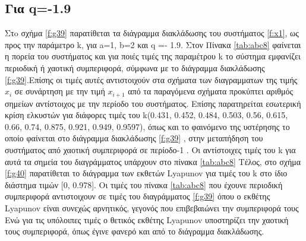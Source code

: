\subsection{Για q=-1.9}
Στo σχήμα \ref{f:g39} παρατίθεται τα διάγραμμα διακλάδωσης του συστήματος \ref{f:x1}, ως προς την παράμετρο k, για a=1, b=2 και q =- 1.9. 
Στον Πίνακα \ref{tab:abc8} φαίνεται η πορεία του συστήματος και για ποιές τιμές της παραμέτρου  k το σύστημα εμφανίζει περιοδική ή χαοτική συμπεριφορά, σύμφωνα με το διάγραμμα διακλάδωσης \ref{f:g39}.Επίσης οι τιμές αυτές αντιστοιχούν στα σχήματα των διαγραμματων της τιμής \(x_i\) σε συνάρτηση με την τιμή \(x_{i+1}\) από τα παραγόμενα σχήματα προκύπτει αριθμός σημείων αντίστοιχος με την περίοδο του συστήματος.
Επίσης παρατηρείται εσωτερική κρίση ελκυστών για διάφορες τιμές του k(0.431, 0.452, 0.484, 0.503, 0.56, 0.615, 0.66, 0.74, 0.875, 0.921, 0.949, 0.9597), όπως και το φαινόμενο της υστέρησης το οποίο φαίνεται στο διάγραμμα διακλάδωσης \ref{f:g39} , στην μεταπήδηση του συστήματος από χαοτική συμπεριφορά σε περίοδο-1 . Οι αντίστοιχες τιμές του k για αυτά τα σημεία του διαγράμματος υπάρχουν στο πίνακα \ref{tab:abc8}
Τέλος, στο σχήμα \ref{f:g40} παρατίθεται το διάγραμμα των εκθετών Lyapunov για τιμές του k στο ίδιο διάστημα τιμών [0, 0.978]. Οι τιμές του πίνακα \ref{tab:abc8} που έχουνε περιοδική συμπεριφορά αντιστοιχουν σε τιμές του διαγράμματος \ref{f:g39} όπου ο εκθέτης Lyapunov είναι συνεχώς αρνητικός, γεγονός που επιβεβαιώνει την συμπεριφορά τους Ενώ για τις υπόλοιπες τιμές ο θετικός εκθέτης Lyapunov υποστηρίζει την χαοτική τους συμπεριφορά, όπως έγινε φανερό και από το διάγραμμα διακλάδωσης.



